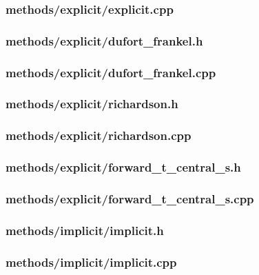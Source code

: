 \documentclass[12pt]{article}
\begin{document}
\subsubsection*{methods/explicit/explicit.cpp}


\subsubsection*{methods/explicit/dufort\_frankel.h}


\subsubsection*{methods/explicit/dufort\_frankel.cpp}


\subsubsection*{methods/explicit/richardson.h}


\subsubsection*{methods/explicit/richardson.cpp}


\subsubsection*{methods/explicit/forward\_t\_central\_s.h}


\subsubsection*{methods/explicit/forward\_t\_central\_s.cpp}


\subsubsection*{methods/implicit/implicit.h}


\subsubsection*{methods/implicit/implicit.cpp}

\end{document}
